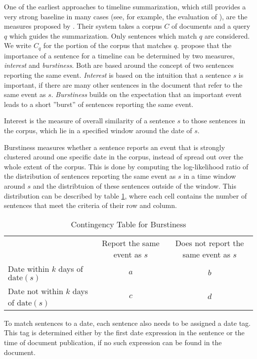 \documentclass[a4paper,BCOR=10mm]{report}
\begin{document}
One of the earliest approaches to timeline summarization, which still provides a very strong baseline in many cases (see, for example, the evaluation of \citet{markert}), are the measures proposed by \citet{chieu}.
Their system takes a corpus $C$ of documents and a query $q$ which guides the summarization. Only sentences which match $q$ are considered. We write $C_q$ for the portion of the corpus that matches $q$.
\citeauthor{chieu} propose that the importance of a sentence for a timeline can be determined by two measures, \textit{interest} and \textit{burstiness}.
Both are based around the concept of two sentences reporting the same event. \textit{Interest} is based on the intuition that a sentence $s$ is important, if there are many other sentences in the document that refer to the same event as $s$. \textit{Burstiness} builds on the expectation that an important event leads to a short ''burst'' of sentences reporting the same event.

Interest is the measure of overall similarity of a sentence $s$ to those sentences in the corpus, which lie in a specified window around the date of $s$.

Burstiness measures whether a sentence reports an event that is strongly clustered around one specific date in the corpus, instead of spread out over the whole extent of the corpus. This is done by computing the log-likelihood ratio of the distribution of sentences reporting the same event as $s$ in a time window around $s$ and the distribtuion of these sentences outside of the window.
This distribution can be described by table \ref{tab:chieu}, where each cell contains the number of sentences that meet the criteria of their row and column.

\begin{table}
\begin{tabular}{|l|c|c|}
& Report the same event as $s$ & Does not report the same event as $s$ \\
Date within $k$ days of $\text{date}(s)$ & $a$ & $b$ \\
Date not within $k$ days of $\text{date}(s)$ & $c$ & $d$
\end{tabular}
\caption{Contingency Table for Burstiness}
\label{tab:chieu}
\end{table}

To match sentences to a date, each sentence also needs to be assigned a date tag. This tag is determined either by the first date expression in the sentence or the time of document publication, if no such expression can be found in the document.
\end{document}
